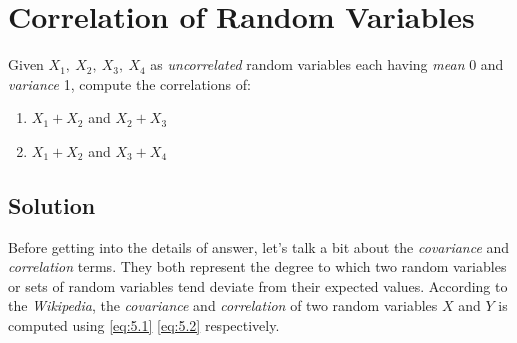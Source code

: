 \documentclass[12pt]{article}
\numberwithin{equation}{section}
\numberwithin{table}{section}
\numberwithin{figure}{section}
\begin{document}
\section{Correlation of Random Variables}
Given $X_1,\ X_2,\ X_3,\ X_4$ as \textit{uncorrelated} random variables each having \textit{mean} 0 and \textit{variance} 1, compute the correlations of:\\
\begin{enumerate}[label=(\alph*)]
	\item $X_1 + X_2$ and $X_2 + X_3$
	
	\item $X_1 + X_2$ and $X_3 + X_4$
\end{enumerate}

\subsection*{Solution}
Before getting into the details of answer, let's talk a bit about the \textit{covariance} and \textit{correlation} terms. They both represent the degree to which two random variables or sets of random variables tend deviate from their expected values. According to the \textit{Wikipedia}, the \textit{covariance} and \textit{correlation} of two random variables $X$ and $Y$ is computed using \ref{eq:5.1}  \ref{eq:5.2} respectively.
\end{document}
